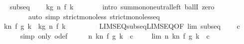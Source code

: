 \begin{isabellebody}
\ \isamarkupfalse%
\ subseq\ \isamarkupfalse%
\ {\isachardoublequoteopen}{\isasymdots}\ {\isacharequal}{\kern0pt}\ {\isacharparenleft}{\kern0pt}{\isasymSum}k{\isacharless}{\kern0pt}g\ n{\isachardot}{\kern0pt}\ f\ k{\isacharparenright}{\kern0pt}{\isachardoublequoteclose}\isanewline
\ \ \ \ \ \ \isamarkupfalse%
\ {\isacharparenleft}{\kern0pt}intro\ sum{\isachardot}{\kern0pt}mono{\isacharunderscore}{\kern0pt}neutral{\isacharunderscore}{\kern0pt}left\ ballI\ zero{\isacharparenright}{\kern0pt}\isanewline
\ \ \ \ \ \ \ \ {\isacharparenleft}{\kern0pt}auto\ simp{\isacharcolon}{\kern0pt}\ strict{\isacharunderscore}{\kern0pt}mono{\isacharunderscore}{\kern0pt}less\ strict{\isacharunderscore}{\kern0pt}mono{\isacharunderscore}{\kern0pt}less{\isacharunderscore}{\kern0pt}eq{\isacharparenright}{\kern0pt}\isanewline
\ \ \ \ \isamarkupfalse%
\ \isamarkupfalse%
\ {\isachardoublequoteopen}{\isacharparenleft}{\kern0pt}{\isasymSum}k{\isacharless}{\kern0pt}n{\isachardot}{\kern0pt}\ f\ {\isacharparenleft}{\kern0pt}g\ k{\isacharparenright}{\kern0pt}{\isacharparenright}{\kern0pt}\ {\isacharequal}{\kern0pt}\ {\isacharparenleft}{\kern0pt}{\isasymSum}k{\isacharless}{\kern0pt}g\ n{\isachardot}{\kern0pt}\ f\ k{\isacharparenright}{\kern0pt}{\isachardoublequoteclose}\ \isacommand{{\isachardot}{\kern0pt}}\isamarkupfalse%
\isanewline
\ \ \isamarkupfalse%
\isanewline
\ \ \isamarkupfalse%
\ \isamarkupfalse%
\ LIMSEQ{\isacharunderscore}{\kern0pt}subseq{\isacharunderscore}{\kern0pt}LIMSEQ{\isacharbrackleft}{\kern0pt}OF\ lim\ subseq{\isacharbrackright}{\kern0pt}\ \isamarkupfalse%
\ {\isachardoublequoteopen}{\isasymdots}\ {\isasymlonglonglongrightarrow}\ c{\isachardoublequoteclose}\isanewline
\ \ \ \ \isamarkupfalse%
\ {\isacharparenleft}{\kern0pt}simp\ only{\isacharcolon}{\kern0pt}\ o{\isacharunderscore}{\kern0pt}def{\isacharparenright}{\kern0pt}\isanewline
\ \ \isamarkupfalse%
\ \isamarkupfalse%
\ {\isachardoublequoteopen}{\isacharparenleft}{\kern0pt}{\isasymlambda}n{\isachardot}{\kern0pt}\ {\isasymSum}k{\isacharless}{\kern0pt}n{\isachardot}{\kern0pt}\ f\ {\isacharparenleft}{\kern0pt}g\ k{\isacharparenright}{\kern0pt}{\isacharparenright}{\kern0pt}\ {\isasymlonglonglongrightarrow}\ c{\isachardoublequoteclose}\ \isacommand{{\isachardot}{\kern0pt}}\isamarkupfalse%
\isanewline
{}\isamarkupfalse%
\isanewline
\ \ \isamarkupfalse%
\ lim{\isacharcolon}{\kern0pt}\ {\isachardoublequoteopen}{\isacharparenleft}{\kern0pt}{\isasymlambda}n{\isachardot}{\kern0pt}\ {\isasymSum}k{\isacharless}{\kern0pt}n{\isachardot}{\kern0pt}\ f\ {\isacharparenleft}{\kern0pt}g\ k{\isacharparenright}{\kern0pt}{\isacharparenright}{\kern0pt}\ {\isasymlonglonglongrightarrow}\ c{\isachardoublequoteclose}\isanewline

\end{isabellebody}
